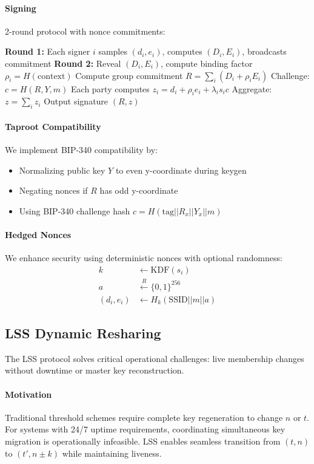 \documentclass[11pt,twocolumn]{article}
\begin{document}
\paragraph{Signing} 2-round protocol with nonce commitments:
\begin{algorithmic}[1]
\State \textbf{Round 1:} Each signer $i$ samples $(d_i, e_i)$, computes $(D_i, E_i)$, broadcasts commitment
\State \textbf{Round 2:} Reveal $(D_i, E_i)$, compute binding factor $\rho_i = H(\text{context})$
\State Compute group commitment $R = \sum_i (D_i + \rho_i E_i)$
\State Challenge: $c = H(R, Y, m)$
\State Each party computes $z_i = d_i + \rho_i e_i + \lambda_i s_i c$
\State Aggregate: $z = \sum_i z_i$
\State Output signature $(R, z)$
\end{algorithmic}

\paragraph{Taproot Compatibility} We implement BIP-340 \cite{bip340} compatibility by:
\begin{itemize}
\item Normalizing public key $Y$ to even y-coordinate during keygen
\item Negating nonces if $R$ has odd y-coordinate
\item Using BIP-340 challenge hash $c = H(\text{tag} || R_x || Y_x || m)$
\end{itemize}

\paragraph{Hedged Nonces} We enhance security using deterministic nonces with optional randomness:
\begin{align*}
k &\leftarrow \text{KDF}(s_i) \\
a &\xleftarrow{R} \{0,1\}^{256} \\
(d_i, e_i) &\leftarrow H_k(\text{SSID} || m || a)
\end{align*}

\subsection{LSS Dynamic Resharing}

The LSS protocol \cite{seesahai2025} solves critical operational challenges: live membership changes without downtime or master key reconstruction.

\paragraph{Motivation} Traditional threshold schemes require complete key regeneration to change $n$ or $t$. For systems with 24/7 uptime requirements, coordinating simultaneous key migration is operationally infeasible. LSS enables seamless transition from $(t,n)$ to $(t', n \pm k)$ while maintaining liveness.
\end{document}
